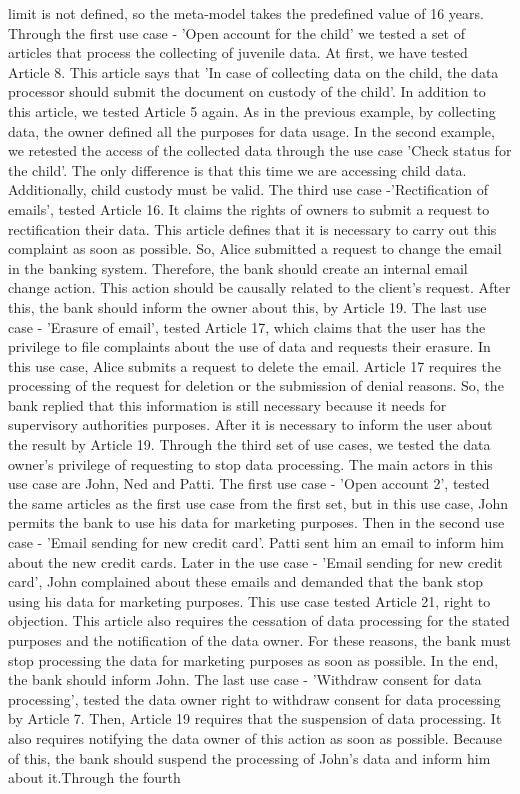 \documentclass[11pt,english]{article}
\begin{document}
limit is not defined, so the meta-model takes the predefined value of 16 years. Through the first use case - 'Open account for the child' we tested a set of articles that process the collecting of juvenile data. At first, we have tested Article 8. This article says that 'In case of collecting data on the child, the data processor should submit the document on custody of the child'. In addition to this article, we tested Article 5 again. As in the previous example, by collecting data, the owner defined all the purposes for data usage. In the second example, we retested the access of the collected data through the use case 'Check status for the child'. The only difference is that this time we are accessing child data. Additionally, child custody must be valid. The third use case -'Rectification of emails', tested Article 16. It claims the rights of owners to submit a request to rectification their data. This article defines that it is necessary to carry out this complaint as soon as possible. So, Alice submitted a request to change the email in the banking system. Therefore, the bank should create an internal email change action. This action should be causally related to the client's request. After this, the bank should inform the owner about this, by Article 19. The last use case - 'Erasure of email', tested Article 17, which claims that the user has the privilege to file complaints about the use of data and requests their erasure. In this use case, Alice submits a request to delete the email. Article 17 requires the processing of the request for deletion or the submission of denial reasons. So, the bank replied that this information is still necessary because it needs for supervisory authorities purposes. After it is necessary to inform the user about the result by Article 19. \newline Through the third set of use cases, we tested the data owner's privilege of requesting to stop data processing. The main actors in this use case are John, Ned and Patti. The first use case - 'Open account 2', tested the same articles as the first use case from the first set, but in this use case, John permits the bank to use his data for marketing purposes. Then in the second use case - 'Email sending for new credit card'. Patti sent him an email to inform him about the new credit cards. Later in the use case - 'Email sending for new credit card', John complained about these emails and demanded that the bank stop using his data for marketing purposes. This use case tested Article 21, right to objection. This article also requires the cessation of data processing for the stated purposes and the notification of the data owner. For these reasons, the bank must stop processing the data for marketing purposes as soon as possible. In the end, the bank should inform John. The last use case - 'Withdraw consent for data processing', tested the data owner right to withdraw consent for data processing by Article 7. Then, Article 19 requires that the suspension of data processing. It also requires notifying the data owner of this action as soon as possible. Because of this, the bank should suspend the processing of John's data and inform him about it.\newline Through the fourth 
\end{document}
